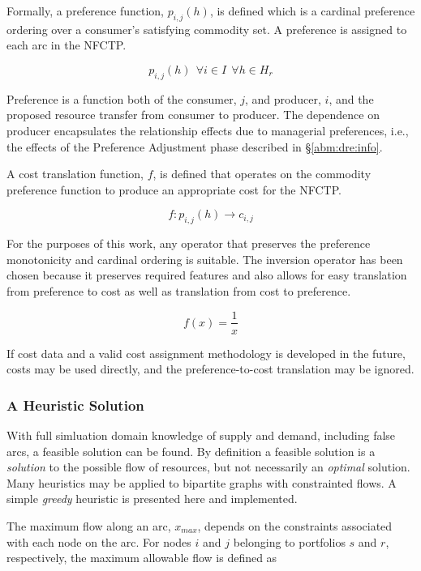 Formally, a preference function, $p_{i, j}(h)$, is defined which is a cardinal
preference ordering over a consumer's satisfying commodity set. A preference is
assigned to each arc in the NFCTP.

\begin{equation}
p_{i, j}(h) \:\: \forall i \in I  \:\: \forall h \in H_{r} 
\end{equation}

Preference is a function both of the consumer, $j$, and producer, $i$, and the
proposed resource transfer from consumer to producer. The dependence on producer
encapsulates the relationship effects due to managerial preferences, i.e., the
effects of the Preference Adjustment phase described in \S \ref{abm:dre:info}.

A cost translation function, $f$, is defined that operates on the commodity
preference function to produce an appropriate cost for the NFCTP.

\begin{equation}
f : p_{i,j}(h) \to c_{i,j}
\end{equation}

For the purposes of this work, any operator that preserves the preference
monotonicity and cardinal ordering is suitable.  The inversion operator has been
chosen because it preserves required features and also allows for easy
translation from preference to cost as well as translation from cost to
preference.

\begin{equation}
f(x) = \frac{1}{x}
\end{equation}

If cost data and a valid cost assignment methodology is developed in the future,
costs may be used directly, and the preference-to-cost translation may be
ignored.

\subsubsection{A Heuristic Solution}

With full simluation domain knowledge of supply and demand, including false
arcs, a feasible solution can be found. By definition a feasible solution is a
\textit{solution} to the possible flow of resources, but not necessarily an
\textit{optimal} solution. Many heuristics may be applied to bipartite graphs
with constrainted flows. A simple \textit{greedy} heuristic is presented here
and implemented. 

The maximum flow along an arc, $x_{max}$, depends on the constraints associated
with each node on the arc. For nodes $i$ and $j$ belonging to portfolios $s$ and
$r$, respectively, the maximum allowable flow is defined as


